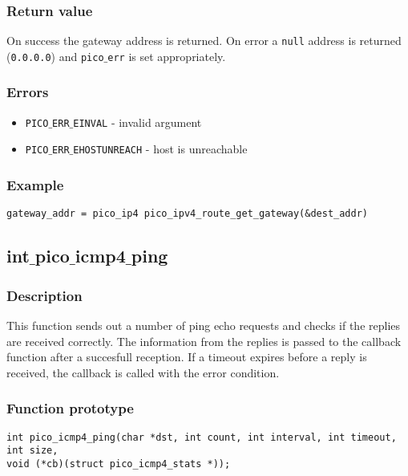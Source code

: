 \subsubsection*{Return value}
On success the gateway address is returned.
On error a \texttt{null} address is returned (\texttt{0.0.0.0}) and \texttt{pico$\_$err} is set appropriately.

\subsubsection*{Errors}
\begin{itemize}[noitemsep]
\item \texttt{PICO$\_$ERR$\_$EINVAL} - invalid argument
\item \texttt{PICO$\_$ERR$\_$EHOSTUNREACH} - host is unreachable
\end{itemize}

\subsubsection*{Example}
\begin{verbatim}
gateway_addr = pico_ip4 pico_ipv4_route_get_gateway(&dest_addr)
\end{verbatim}


\subsection{int$\_$pico$\_$icmp4$\_$ping}

\subsubsection*{Description}
This function sends out a number of ping echo requests and checks if the replies are received correctly.
The information from the replies is passed to the callback function after a succesfull reception.
If a timeout expires before a reply is received, the callback is called with the error condition.

\subsubsection*{Function prototype}
\begin{verbatim}
int pico_icmp4_ping(char *dst, int count, int interval, int timeout, int size,
void (*cb)(struct pico_icmp4_stats *));
\end{verbatim}

